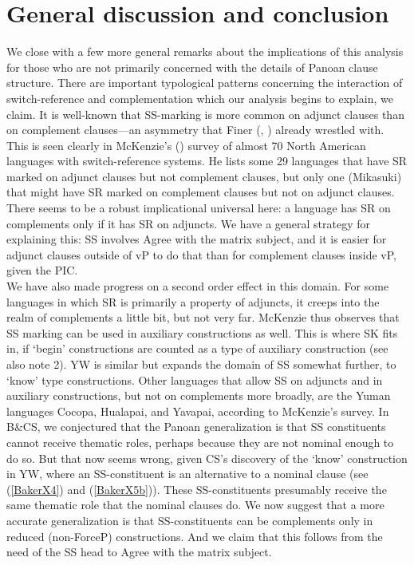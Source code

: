 \documentclass[output=paper,colorlinks,citecolor=brown,
]{langscibook}
\begin{document}
\section{General discussion and conclusion}

We close with a few more general remarks about the implications of this analysis for those who are not primarily concerned with the details of Panoan clause structure. There are important typological patterns concerning the interaction of switch-reference and complementation which our analysis begins to explain, we claim. It is well-known that SS-marking is more common on adjunct clauses than on complement clauses—an asymmetry that Finer (\citeyear{finer1984formal}, \citeyear{finer1985syntax}) already wrestled with. This is seen clearly in McKenzie’s (\citeyear{mckenzie2015survey}) survey of almost 70 North American languages with switch-reference systems. He lists some 29 languages that have SR marked on adjunct clauses but not complement clauses, but only one (Mikasuki) that might have SR marked on complement clauses but not on adjunct clauses. There seems to be a robust implicational universal here: a language has SR on complements only if it has SR on adjuncts. We have a general strategy for explaining this: SS involves Agree with the matrix subject, and it is easier for adjunct clauses outside of vP to do that than for complement clauses inside vP, given the PIC.\\

We have also made progress on a second order effect in this domain. For some languages in which SR is primarily a property of adjuncts, it creeps into the realm of complements a little bit, but not very far. McKenzie thus observes that SS marking can be used in auxiliary constructions as well. This is where SK fits in, if ‘begin’ constructions are counted as a type of auxiliary construction (see also note 2). YW is similar but expands the domain of SS somewhat further, to ‘know’ type constructions. Other languages that allow SS on adjuncts and in auxiliary constructions, but not on complements more broadly, are the Yuman languages Cocopa, Hualapai, and Yavapai, according to McKenzie’s survey. In B\&CS, we conjectured that the Panoan generalization is that SS constituents cannot receive thematic roles, perhaps because they are not nominal enough to do so. But that now seems wrong, given CS’s discovery of the ‘know’ construction in YW, where an SS-constituent is an alternative to a nominal clause (see (\ref{BakerX4}) and (\ref{BakerX5b})). These SS-constituents presumably receive the same thematic role that the nominal clauses do. We now suggest that a more accurate generalization is that SS-constituents can be complements only in reduced (non-ForceP) constructions. And we claim that this follows from the need of the SS head to Agree with the matrix subject.\\
\end{document}
